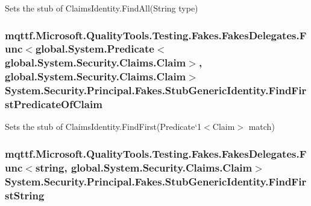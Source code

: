 Sets the stub of Claims\-Identity.\-Find\-All(\-String type)

\hypertarget{class_system_1_1_security_1_1_principal_1_1_fakes_1_1_stub_generic_identity_a3e1c80693dcd6249b162098e4dae5a00}{
\subsubsection[{Find\-First\-Predicate\-Of\-Claim}]{\setlength{\rightskip}{0pt plus 5cm}mqttf.\-Microsoft.\-Quality\-Tools.\-Testing.\-Fakes.\-Fakes\-Delegates.\-Func$<$global.\-System.\-Predicate$<$global.\-System.\-Security.\-Claims.\-Claim$>$, global.\-System.\-Security.\-Claims.\-Claim$>$ System.\-Security.\-Principal.\-Fakes.\-Stub\-Generic\-Identity.\-Find\-First\-Predicate\-Of\-Claim}}\label{class_system_1_1_security_1_1_principal_1_1_fakes_1_1_stub_generic_identity_a3e1c80693dcd6249b162098e4dae5a00}


Sets the stub of Claims\-Identity.\-Find\-First(Predicate`1$<$Claim$>$ match)

\hypertarget{class_system_1_1_security_1_1_principal_1_1_fakes_1_1_stub_generic_identity_a3bab526b932b3462e5c3123bd08a1a96}{
\subsubsection[{Find\-First\-String}]{\setlength{\rightskip}{0pt plus 5cm}mqttf.\-Microsoft.\-Quality\-Tools.\-Testing.\-Fakes.\-Fakes\-Delegates.\-Func$<$string, global.\-System.\-Security.\-Claims.\-Claim$>$ System.\-Security.\-Principal.\-Fakes.\-Stub\-Generic\-Identity.\-Find\-First\-String}}\label{class_system_1_1_security_1_1_principal_1_1_fakes_1_1_stub_generic_identity_a3bab526b932b3462e5c3123bd08a1a96}



